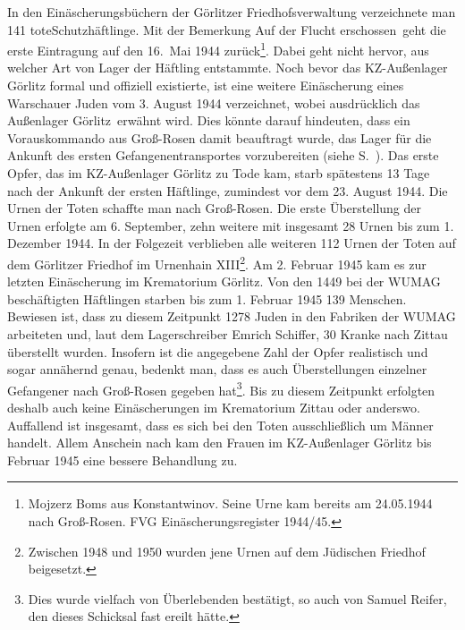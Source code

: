 In den Einäscherungsbüchern der Görlitzer Friedhofsverwaltung verzeichnete man 141 tote\linebreak \glqq Schutzhäftlinge\grqq. Mit der Bemerkung \glqq Auf der Flucht erschossen\grqq~geht die erste Eintragung auf den 16.~Mai 1944 zurück\footnote{Mojzerz Boms aus Konstantwinov. Seine Urne kam bereits am 24.05.1944 nach Groß-Rosen. FVG Einäscherungsregister 1944/45.}. Dabei geht nicht hervor, aus welcher Art von Lager der Häftling entstammte. Noch bevor das KZ-Außenlager Görlitz formal und offiziell existierte, ist eine weitere Einäscherung eines Warschauer Juden vom 3. August 1944 verzeichnet, wobei ausdrücklich das \glqq Außenlager Görlitz\grqq~erwähnt wird. Dies könnte darauf hindeuten, dass ein Vorauskommando aus Groß-Rosen damit beauftragt wurde, das Lager für die Ankunft des ersten Gefangenentransportes vorzubereiten (siehe S.~\pageref{vorauskommando}).
\newline
Das erste Opfer, das im KZ-Außenlager Görlitz zu Tode kam, starb spätestens 13 Tage nach der Ankunft der ersten Häftlinge, zumindest vor dem 23. August 1944. Die Urnen der Toten schaffte man nach Groß-Rosen. Die erste Überstellung der Urnen erfolgte am 6. September, zehn weitere mit insgesamt 28 Urnen bis zum 1. Dezember 1944. In der Folgezeit verblieben alle weiteren 112 Urnen der Toten auf dem Görlitzer Friedhof im Urnenhain XIII\footnote{Zwischen 1948 und 1950 wurden jene Urnen auf dem Jüdischen Friedhof beigesetzt.}. Am 2. Februar 1945 kam es zur letzten Einäscherung im Krematorium Görlitz. Von den 1449 bei der WUMAG beschäftigten Häftlingen starben bis zum 1. Februar 1945 139 Menschen. Bewiesen ist, dass zu diesem Zeitpunkt 1278 Juden in den Fabriken der WUMAG arbeiteten und, laut dem Lagerschreiber Emrich Schiffer, 30 Kranke nach Zittau überstellt wurden. Insofern ist die angegebene Zahl der Opfer realistisch und sogar annähernd genau, bedenkt man, dass es auch Überstellungen einzelner Gefangener nach Groß-Rosen gegeben hat\footnote{Dies wurde vielfach von Überlebenden bestätigt, so auch von Samuel Reifer, den dieses Schicksal fast ereilt hätte.}.
Bis zu diesem Zeitpunkt erfolgten deshalb auch keine Einäscherungen im Krematorium Zittau oder anderswo. 
~\newline
Auffallend ist insgesamt, dass es sich bei den Toten ausschließlich um Männer handelt. Allem Anschein nach kam den Frauen im KZ-Außenlager Görlitz bis Februar 1945 eine bessere Behandlung zu.
